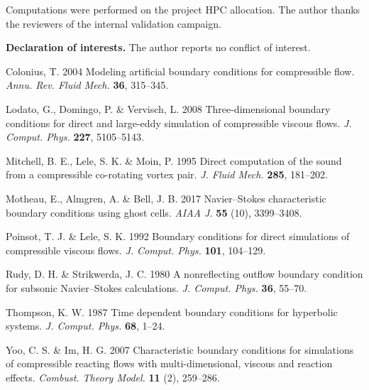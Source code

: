 \documentclass{jfm}
\begin{document}
\begin{acknowledgements}
Computations were performed on the project HPC allocation. The author thanks the
reviewers of the internal validation campaign.
\end{acknowledgements}

\noindent\textbf{Declaration of interests.} The author reports no conflict of
interest.

\begin{thebibliography}{}

Colonius, T. 2004 Modeling artificial boundary conditions for compressible flow.
\textit{Annu. Rev. Fluid Mech.} \textbf{36}, 315--345.

Lodato, G., Domingo, P. \& Vervisch, L. 2008 Three-dimensional boundary
conditions for direct and large-eddy simulation of compressible viscous flows.
\textit{J. Comput. Phys.} \textbf{227}, 5105--5143.

Mitchell, B. E., Lele, S. K. \& Moin, P. 1995 Direct computation of the sound
from a compressible co-rotating vortex pair. \textit{J. Fluid Mech.}
\textbf{285}, 181--202.

Motheau, E., Almgren, A. \& Bell, J. B. 2017 Navier--Stokes characteristic
boundary conditions using ghost cells. \textit{AIAA J.} \textbf{55} (10),
3399--3408.

Poinsot, T. J. \& Lele, S. K. 1992 Boundary conditions for direct simulations of
compressible viscous flows. \textit{J. Comput. Phys.} \textbf{101}, 104--129.

Rudy, D. H. \& Strikwerda, J. C. 1980 A nonreflecting outflow boundary condition
for subsonic Navier--Stokes calculations. \textit{J. Comput. Phys.}
\textbf{36}, 55--70.

Thompson, K. W. 1987 Time dependent boundary conditions for hyperbolic systems.
\textit{J. Comput. Phys.} \textbf{68}, 1--24.

Yoo, C. S. \& Im, H. G. 2007 Characteristic boundary conditions for simulations
of compressible reacting flows with multi-dimensional, viscous and reaction
effects. \textit{Combust. Theory Model.} \textbf{11} (2), 259--286.

\end{thebibliography}
\end{document}

